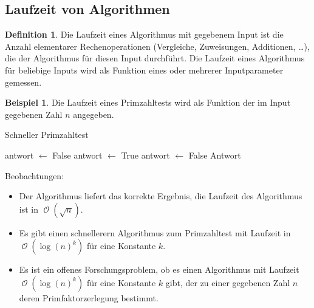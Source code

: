 \documentclass[a4paper,12pt]{article}
\DeclareMathOperator{\BigO}{\mathcal O}
\theoremstyle{definition}
\newtheorem*{example}{Beispiel}
\newtheorem{definition}[axiom]{Definition}
\begin{document}
	\setcounter{section}{1}
	\setcounter{subsection}{5}
	\subsection{Laufzeit von Algorithmen}
	\begin{definition}
		Die Laufzeit eines Algorithmus mit gegebenem Input ist die Anzahl elementarer Rechenoperationen (Vergleiche, Zuweisungen, Additionen, \dots), die der Algorithmus für diesen Input durchführt. Die Laufzeit eines Algorithmus für beliebige Inputs wird als Funktion eines oder mehrerer Inputparameter gemessen.
	\end{definition}
	\begin{example}
		Die Laufzeit eines Primzahltests wird als Funktion der im Input gegebenen Zahl $n$ angegeben.
			\begin{algorithm}
				\caption{Schneller Primzahltest}
				\begin{algorithmic}
						\State antwort $\gets$ False
					\Else
						\State antwort $\gets$ True
					\EndIf
							\State antwort $\gets$ False
						\EndIf
					\EndFor
					\State \Return Antwort
				\end{algorithmic}
			\end{algorithm}
			Beobachtungen:
			\begin{itemize}
				\item Der Algorithmus liefert das korrekte Ergebnis, die Laufzeit des Algorithmus ist in $\BigO(\sqrt{n})$.
				\item Es gibt einen schnellerern Algorithmus zum Primzahltest mit Laufzeit in $\BigO(\log(n)^k)$ für eine Konstante $k$.
				\item Es ist ein offenes Forschungsproblem, ob es einen Algorithmus mit Laufzeit $\BigO(\log(n)^k)$ für eine Konstante $k$ gibt, der zu einer gegebenen Zahl $n$ deren Primfaktorzerlegung bestimmt.
			\end{itemize}
	\end{example}
\end{document}
